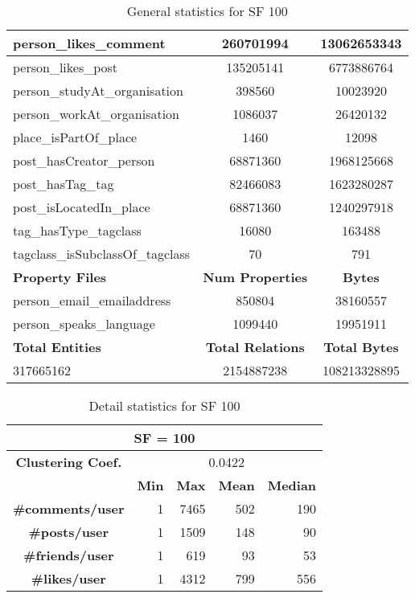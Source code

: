 \begin{table}[H]
\begin{tabular} {| l | c | c |}
        \hline
        person\_likes\_comment & 260701994 & 13062653343 \\
        \hline
        person\_likes\_post & 135205141 & 6773886764 \\
        \hline
        person\_studyAt\_organisation & 398560 & 10023920 \\
        \hline
        person\_workAt\_organisation & 1086037 & 26420132 \\
        \hline
        place\_isPartOf\_place & 1460 & 12098 \\
        \hline
        post\_hasCreator\_person & 68871360 & 1968125668 \\
        \hline
        post\_hasTag\_tag & 82466083 & 1623280287 \\
        \hline
        post\_isLocatedIn\_place & 68871360 & 1240297918 \\
        \hline
        tag\_hasType\_tagclass & 16080 & 163488 \\
        \hline
        tagclass\_isSubclassOf\_tagclass & 70 & 791 \\
        \hline
        \hline
        \textbf{Property Files} & \textbf{Num Properties} & \textbf{Bytes} \\
        \hline
        \hline
        person\_email\_emailaddress & 850804 & 38160557 \\
        \hline
        person\_speaks\_language & 1099440 & 19951911 \\
        \hline
        \hline
        \textbf{Total Entities} & \textbf{Total Relations} & \textbf{Total Bytes} \\
        \hline
        \hline
         317665162 & 2154887238 & 108213328895 \\
        \hline
    \end{tabular}
    \caption{General statistics for SF 100}
\end{table}

\begin{table}[H]
\centering
\begin{tabular}{|c||r|r|r|r|}
\hline    \multicolumn{5}{|c|}{SF = 100 }  \\
\hline   \textbf{Clustering Coef.} &   \multicolumn{4}{|c|}{0.0422} \\
                            \hline & \textbf{Min} & \textbf{Max} & \textbf{Mean} & \textbf{Median}   \\
 \hline  \textbf{\#comments/user}  &1 &  7465 & 502 & 190 \\
    \hline  \textbf{\#posts/user}  &1 &  1509 & 148 & 90 \\
  \hline  \textbf{\#friends/user}  &1 &  619 & 93 & 53 \\
    \hline  \textbf{\#likes/user}  &1 &  4312 & 799 & 556 \\
\hline
\end{tabular}
\caption{Detail statistics for SF 100}
\end{table}

